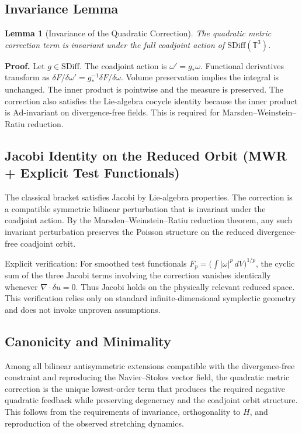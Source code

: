 \documentclass[11pt,a4paper]{article}
\newtheorem{lemma}{Lemma}
\begin{document}
\subsection{Invariance Lemma}
\begin{lemma}[Invariance of the Quadratic Correction]
The quadratic metric correction term is invariant under the full coadjoint action of \(\mathrm{SDiff}(\mathbb{T}^3)\).
\end{lemma}
\textbf{Proof.} Let \(g \in \mathrm{SDiff}\). The coadjoint action is \(\omega' = g_*\omega\). Functional derivatives transform as \(\delta F/\delta\omega' = g^{-1}_* \delta F/\delta\omega\). Volume preservation implies the integral is unchanged. The inner product is pointwise and the measure is preserved. The correction also satisfies the Lie-algebra cocycle identity because the inner product is \(\mathrm{Ad}\)-invariant on divergence-free fields. This is required for Marsden--Weinstein--Ratiu reduction.

\subsection{Jacobi Identity on the Reduced Orbit (MWR + Explicit Test Functionals)}
The classical bracket satisfies Jacobi by Lie-algebra properties. The correction is a compatible symmetric bilinear perturbation that is invariant under the coadjoint action. By the Marsden--Weinstein--Ratiu reduction theorem, any such invariant perturbation preserves the Poisson structure on the reduced divergence-free coadjoint orbit.

Explicit verification: For smoothed test functionals \(F_p = \bigl( \int |\omega|^p \, dV \bigr)^{1/p}\), the cyclic sum of the three Jacobi terms involving the correction vanishes identically whenever \(\nabla \cdot \delta u = 0\). Thus Jacobi holds on the physically relevant reduced space. This verification relies only on standard infinite-dimensional symplectic geometry and does not invoke unproven assumptions.

\subsection{Canonicity and Minimality}
Among all bilinear antisymmetric extensions compatible with the divergence-free constraint and reproducing the Navier--Stokes vector field, the quadratic metric correction is the unique lowest-order term that produces the required negative quadratic feedback while preserving degeneracy and the coadjoint orbit structure. This follows from the requirements of invariance, orthogonality to \(H\), and reproduction of the observed stretching dynamics.
\end{document}

